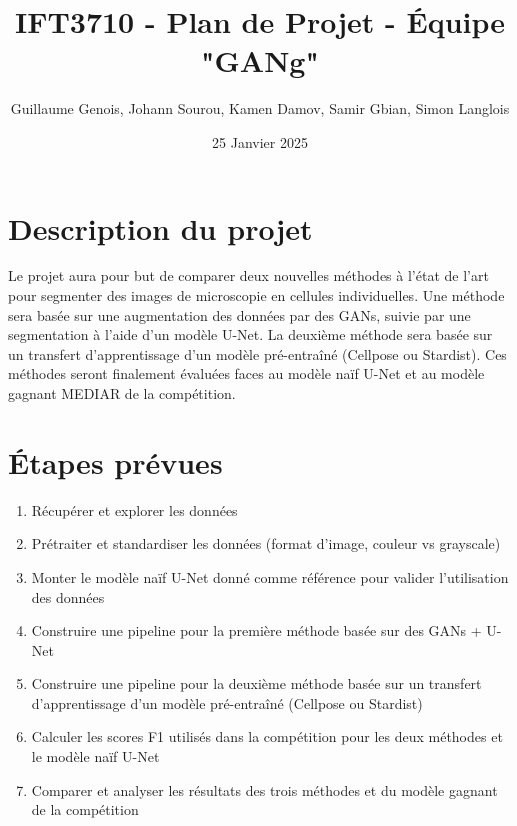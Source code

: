\documentclass{article}
\title{\vspace*{-2cm}IFT3710 - Plan de Projet - Équipe "GANg"}
\author{Guillaume Genois, Johann Sourou,
Kamen Damov, Samir Gbian, Simon Langlois }
\date{25 Janvier 2025}
\begin{document}
\maketitle

\section{Description du projet}
Le projet aura pour but de comparer deux nouvelles méthodes à l'état de l'art pour segmenter des images de microscopie en cellules individuelles. Une méthode sera basée sur une augmentation des données par des GANs, suivie par une segmentation à l'aide d'un modèle U-Net. La deuxième méthode sera basée sur un transfert d'apprentissage d'un modèle pré-entraîné (Cellpose ou Stardist). Ces méthodes seront finalement évaluées faces au modèle naïf U-Net et au modèle gagnant MEDIAR de la compétition.

\section{Étapes prévues}
\begin{enumerate}
    \item Récupérer et explorer les données
    \item Prétraiter et standardiser les données (format d'image, couleur vs grayscale)
    \item Monter le modèle naïf U-Net donné comme référence pour valider l'utilisation des données
    \item Construire une pipeline pour la première méthode basée sur des GANs + U-Net
    \item Construire une pipeline pour la deuxième méthode basée sur un transfert d'apprentissage d'un modèle pré-entraîné (Cellpose ou Stardist)
    \item Calculer les scores F1 utilisés dans la compétition pour les deux méthodes et le modèle naïf U-Net
    \item Comparer et analyser les résultats des trois méthodes et du modèle gagnant de la compétition
\end{enumerate}
\end{document}
